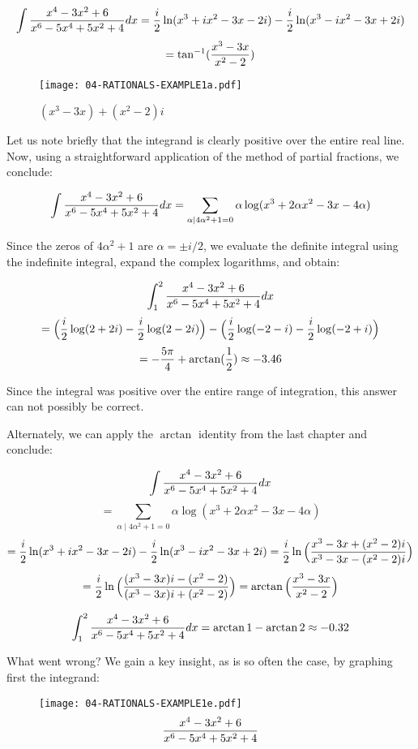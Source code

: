 $$\int {{x^4-3x^2+6}\over{x^6-5x^4+5x^2+4}} dx =
   {i\over2}\ln(x^3+ix^2-3x-2i) - {i\over2}\ln(x^3-ix^2-3x+2i)$$
$$=\tan^{-1}({{x^3-3x}\over{x^2-2}})$$

\vfill

\begin{figure}[h]
\begin{center}
\texttt{[image: 04-RATIONALS-EXAMPLE1a.pdf]}
\end{center}
\caption{$(x^3-3x)+(x^2-2)i$}
\end{figure}

Let us note briefly that the integrand is clearly positive over the
entire real line.  Now, using a straightforward application of
the method of partial fractions, we conclude:

$$\int {{x^4-3x^2+6}\over{x^6-5x^4+5x^2+4}} dx =
   \sum_{\alpha\mid 4\alpha^2+1=0} \alpha \log(x^3+2\alpha x^2-3x-4\alpha)$$

Since the zeros of $4\alpha^2+1$ are $\alpha=\pm i/2$, we evaluate the
definite integral using the indefinite integral, expand the complex
logarithms, and obtain:

$$\int_1^2 {{x^4-3x^2+6}\over{x^6-5x^4+5x^2+4}} dx $$
$$= \Big({i\over2}\log(2+2i)-{i\over2}\log(2-2i)\Big)
 -\Big({i\over2}\log(-2-i)-{i\over2}\log(-2+i)\Big)$$
$$=-{5\pi\over4}+\arctan({1\over2}) \approx -3.46$$

Since the integral was positive over the entire range of integration,
this answer can not possibly be correct.

Alternately, we can apply the $\arctan$ identity from the last
chapter and conclude:

$$\int {{x^4-3x^2+6}\over{x^6-5x^4+5x^2+4}} dx $$
$$=\sum_{\alpha\mid 4\alpha^2+1=0} \alpha \log(x^3+2\alpha x^2-3x-4\alpha)$$
$$={i\over2}\ln(x^3+ix^2-3x-2i)-{i\over2}\ln(x^3-ix^2-3x+2i)
  ={i\over2}\ln{\Big({{x^3-3x+(x^2-2)i}\over{x^3-3x-(x^2-2)i}}\Big)}$$
$$={i\over2}\ln{\Big({{(x^3-3x)i-(x^2-2)}\over{(x^3-3x)i+(x^2-2)}}\Big)}
  =\arctan{\Big({{x^3-3x}\over{x^2-2}}\Big)}$$

$$\int_1^2 {{x^4-3x^2+6}\over{x^6-5x^4+5x^2+4}} dx = \arctan 1 - \arctan 2 \approx -0.32$$

What went wrong?
We gain a
key insight, as is so often the case, by graphing first the integrand:

\begin{figure}[!h]
\begin{center}
\texttt{[image: 04-RATIONALS-EXAMPLE1e.pdf]}
$${{x^4-3x^2+6}\over{x^6-5x^4+5x^2+4}}$$
\end{center}
\end{figure}

